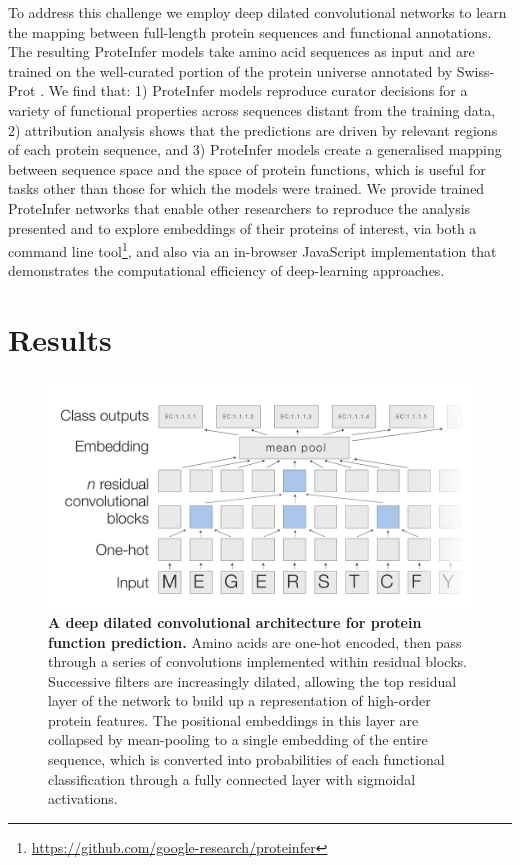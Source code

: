 To address this challenge we employ deep dilated convolutional networks to learn the mapping between full-length protein sequences and functional annotations. The resulting ProteInfer models take amino acid sequences as input and are trained on the well-curated portion of the protein universe annotated by Swiss-Prot \cite{uniprotlatest}. We find that: 1) ProteInfer models reproduce curator decisions for a  variety of functional properties across sequences distant from the training data, 2) attribution analysis shows that the predictions are driven by relevant regions of each protein sequence, and 3) ProteInfer models create a generalised mapping between sequence space and the space of protein functions, which is useful for tasks other than those for which the models were trained. We provide trained ProteInfer networks that enable other researchers to reproduce the analysis presented and to explore embeddings of their proteins of interest, via both a command line tool\footnote{\url{https://github.com/google-research/proteinfer}}, and also via an in-browser JavaScript implementation that demonstrates the computational efficiency of deep-learning approaches.
\section*{Results}

\begin{figure}[h!]
\centering
  \includegraphics[width=\columnwidth]{figure.pdf}%
  \caption{\textbf{A deep dilated convolutional architecture for protein function prediction.} Amino acids are one-hot encoded, then pass through a series of convolutions implemented within residual blocks. Successive filters are increasingly dilated, allowing the top residual layer of the network to build up a representation of high-order protein features. The positional embeddings in this layer are collapsed by mean-pooling to a single embedding of the entire sequence, which is converted into probabilities of each functional classification through a fully connected layer with sigmoidal activations. }
  \label{architecture}
\end{figure}
